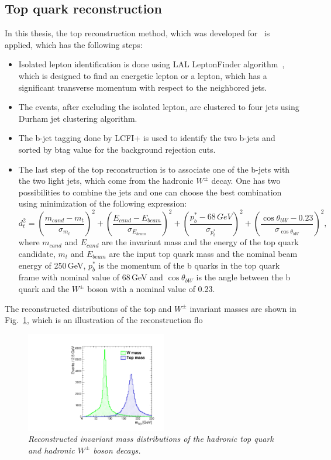 \subsection{Top quark reconstruction}
In this thesis, the top reconstruction method, which was developed for~\cite{bib:ILCTOP} is applied, which has the following steps:
\begin{itemize}
	\item Isolated lepton identification is done using LAL LeptonFinder algorithm~\cite{bib:Doublet}, which is designed to find an energetic lepton or a lepton, which has a significant transverse momentum with respect to the neighbored jets. 
	\item The events, after excluding the isolated lepton, are clustered to four jets using Durham jet clustering algorithm.
	\item The b-jet tagging done by LCFI+ is used to identify the two b-jets and sorted by btag value for the background rejection cuts. 
	\item The last step of the top reconstruction is to associate one of the b-jets with the two light jets, which come from the hadronic $W^\pm$ decay.  One has two possibilities to combine the jets and one can choose the best combination using minimization of the following expression:
	\begin{equation}
	\label{formula:Chi2Top_3}
	d^2_{t} = (\frac{m_{cand}-m_{t}}{\sigma_{m_t}})^2 + (\frac{E_{cand}-E_{beam}}{\sigma_{E_{beam}}})^2+(\frac{p^*_b-68\,GeV}{\sigma_{p^*_b}})^2 + (\frac{\cos\theta_{bW}-0.23}{\sigma_{\cos\theta_{bW}}})^2,
	\end{equation}
	where $m_{cand}$ and $E_{cand}$ are the invariant mass and the energy of the top quark candidate, $m_t$ and $E_{beam}$ are the input top quark mass and the nominal beam energy of 250\,GeV, $p^*_b$ is the momentum of the b quarks in the top quark frame with nominal value of 68\,GeV and $\cos\theta_{bW}$ is the angle between the b quark and the $W^\pm$ boson with a nominal value of 0.23.
\end{itemize}

The reconstructed distributions of the top and $W^\pm$ invariant masses are shown in Fig.~\ref{fig:TopWmass_3}, which is an illustration of the reconstruction flo

\begin{figure}[h]
	{\centering
		\includegraphics[width=0.55\textwidth]{ILD/plots/top-w-mass.pdf}
		\caption{\sl Reconstructed invariant mass distributions of the hadronic top quark and hadronic $W^\pm$ boson decays.
		}
		\label{fig:TopWmass_3}
	}
	
\end{figure}

